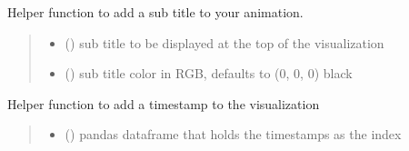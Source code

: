\documentclass[letterpaper,10pt,english]{sphinxmanual}
\begin{document}
\begin{fulllineitems}
\begin{fulllineitems}
\begin{quote}
\begin{description}
\end{description}\end{quote}

\end{fulllineitems}


\begin{fulllineitems}
\label{\detokenize{index:sjvisualizer.Canvas.canvas.add_sub_title}}
\pysigstartsignatures
{}
\pysigstopsignatures
\sphinxAtStartPar
Helper function to add a sub title to your animation.
\begin{quote}\begin{description}
\begin{itemize}
\item {} 
\sphinxAtStartPar
{} () \textendash{} sub title to be displayed at the top of the visualization

\item {} 
\sphinxAtStartPar
{} () \textendash{} sub title color in RGB, defaults to (0, 0, 0) black

\end{itemize}

\end{description}\end{quote}

\end{fulllineitems}


\begin{fulllineitems}
\label{\detokenize{index:sjvisualizer.Canvas.canvas.add_time}}
\pysigstartsignatures
{}
\pysigstopsignatures
\sphinxAtStartPar
Helper function to add a timestamp to the visualization
\begin{quote}\begin{description}
\begin{itemize}
\item {} 
\sphinxAtStartPar
{} () \textendash{} pandas dataframe that holds the timestamps as the index


\end{itemize}
\end{description}
\end{quote}
\end{fulllineitems}
\end{fulllineitems}
\end{document}
